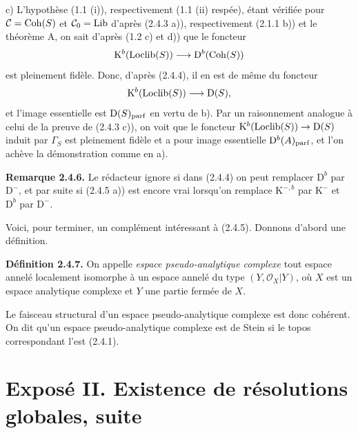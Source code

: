 \documentclass[11pt]{article}
\newcommand{\Spec}{\operatorname{Spec}}
\begin{document}
c) L'hypothèse (1.1 (i)), respectivement (1.1 (ii) respée), étant vérifiée pour $\mathcal C=\Coh(S)$ et $\mathcal C_0=\Lib$ d'après (2.4.3 a)), respectivement (2.1.1 b)) et le théorème A, on sait d'après (1.2 c) et d)) que le foncteur
\[
\mathrm K^b(\Loclib(S))\longrightarrow\mathrm D^b(\Coh(S))
\]
est pleinement fidèle. Donc, d'après (2.4.4), il en est de même du foncteur
\[
\mathrm K^b(\Loclib(S))\longrightarrow\mathrm D(S),
\]
et l'image essentielle est $\mathrm D(S)_{\operatorname{parf}}$ en vertu de b). Par un raisonnement analogue à celui de la preuve de (2.4.3 c)), on voit que le foncteur $\mathrm K^b(\Loclib(S))\to\mathrm D(S)$ induit par $\Gamma_S$ est pleinement fidèle et a pour image essentielle $\mathrm D^b(A)_{\operatorname{parf}}$, et l'on achève la démonstration comme en a).

\textbf{Remarque 2.4.6.} Le rédacteur ignore si dans (2.4.4) on peut remplacer $\mathrm D^b$ par $\mathrm D^{-}$, et par suite si (2.4.5 a)) est encore vrai lorsqu'on remplace $\mathrm K^{-,b}$ par $\mathrm K^{-}$ et $\mathrm D^b$ par $\mathrm D^{-}$.

Voici, pour terminer, un complément intéressant à (2.4.5). Donnons d'abord une définition.

\textbf{Définition 2.4.7.} On appelle \emph{espace pseudo-analytique complexe} tout espace annelé localement isomorphe à un espace annelé du type $(Y,\mathcal O_X|Y)$, où $X$ est un espace analytique complexe et $Y$ une partie fermée de $X$.

Le faisceau structural d'un espace pseudo-analytique complexe est donc cohérent. On dit qu'un espace pseudo-analytique complexe est de Stein si le topos correspondant l'est (2.4.1).



\providecommand{\D}{\mathrm D}
\providecommand{\Kcat}{\mathrm K}
\providecommand{\Qcoh}{\operatorname{Qcoh}}
\providecommand{\Mod}{\operatorname{Mod}}
\providecommand{\Coh}{\operatorname{Coh}}
\providecommand{\Lib}{\operatorname{Lib}}
\providecommand{\Loclib}{\operatorname{Loclib}}
\providecommand{\Hom}{\operatorname{Hom}}
\providecommand{\Ext}{\operatorname{Ext}}
\providecommand{\Ob}{\operatorname{ob}}
\providecommand{\Spec}{\operatorname{Spec}}
\providecommand{\RHom}{\mathrm R\!\operatorname{Hom}}
\providecommand{\ilim}{\varinjlim}
\providecommand{\plim}{\varprojlim}


\section*{Exposé II. Existence de résolutions globales, suite}
\end{document}
